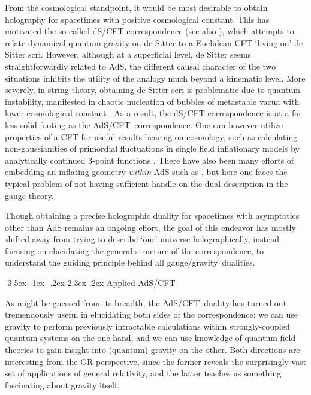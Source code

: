 \documentclass[12pt,a4paper]{article}
\makeatletter
\renewcommand\section{\@startsection {section}{1}{\z@}%
                                   {-3.5ex \@plus -1ex \@minus -.2ex}%
                                   {2.3ex \@plus.2ex}%
                                   {\normalfont\large\bfseries}}
\def\AC{AdS/CFT}
\def\GG{gauge/gravity}
\def\GT{gauge theory}
\makeatother
\begin{document}
From the cosmological standpoint, it would be most desirable to obtain holography for spacetimes with positive cosmological constant.  This has motivated the so-called dS/CFT correspondence \cite{Strominger:2001pn} (see also \cite{Witten:2001kn}), which attempts to relate dynamical quantum gravity on de Sitter to a Euclidean CFT `living on' de Sitter scri.  However, although at a superficial level, de Sitter seems straightforwardly related to AdS, the different causal character of the two situations inhibits the utility of the analogy much beyond a kinematic level.  
More severely, in string theory, obtaining de Sitter scri is problematic due to quantum instability, manifested in chaotic nucleation of bubbles of metastable vacua with lower cosmological constant  \cite{Susskind:2003kw}.  As a result, the  dS/CFT correspondence is at a far less solid footing as the \AC\ correspondence. 
One can however utilize properties of a CFT for useful results bearing on cosmology, such as calculating non-gaussianities of primordial fluctuations in single field inflationary models by analytically continued 3-point functions \cite{Maldacena:2002vr}.
There have also been many efforts of embedding an inflating geometry {\it within} AdS such as \cite{Freivogel:2005qh}, but here one faces the typical problem of not having sufficient handle on the dual description in the \GT.  

 Though obtaining a 
 precise holographic duality for spacetimes with asymptotics other than AdS remains an ongoing effort, the goal of  this endeavor has mostly shifted away from trying to describe `our' universe holographically, instead focusing on elucidating the general structure of the correspondence, to understand the guiding principle behind all \GG\  dualities.

\section{Applied \AC}
\label{s:appliedAC}

As might be guessed from its breadth, the \AC\ duality has turned out  tremendously useful in elucidating both sides of the correspondence: we can use gravity to perform previously intractable calculations within strongly-coupled quantum systems on the one hand, and we can use knowledge of quantum field theories to gain insight into (quantum) gravity on the other.  Both directions are interesting from the GR perspective, since the former reveals the surprisingly vast set of applications of general relativity, and the latter teaches us something fascinating about gravity itself.  
\end{document}
